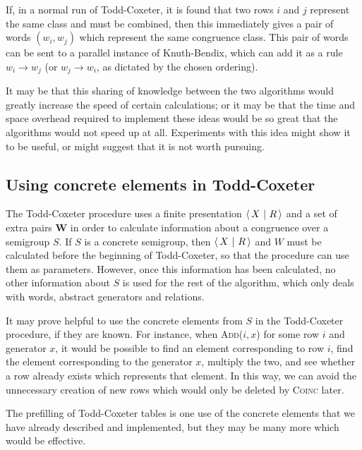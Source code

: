If, in a normal run of Todd-Coxeter, it is found that two rows $i$ and $j$
represent the same class and must be combined, then this immediately gives a
pair of words $(w_i,w_j)$ which represent the same congruence class.  This pair
of words can be sent to a parallel instance of Knuth-Bendix, which can add it as
a rule $w_i \to w_j$ (or $w_j \to w_i$, as dictated by the chosen ordering).

It may be that this sharing of knowledge between the two algorithms would
greatly increase the speed of certain calculations; or it may be that the time
and space overhead required to implement these ideas would be so great that the
algorithms would not speed up at all.  Experiments with this idea might show it
to be useful, or might suggest that it is not worth pursuing.

\subsection{Using concrete elements in Todd-Coxeter}
\label{sec:tc-concrete-elms}
The Todd-Coxeter procedure uses a finite presentation $\left\langle\,X ~\middle|~ R\,\right\rangle$ and a set of
extra pairs $\mathbf{W}$ in order to calculate information about a congruence
over a semigroup $S$.  If $S$ is a concrete semigroup, then $\left\langle\,X ~\middle|~ R\,\right\rangle$ and $W$
must be calculated before the beginning of Todd-Coxeter, so that the procedure
can use them as parameters.  However, once this information has been calculated,
no other information about $S$ is used for the rest of the algorithm, which only
deals with words, abstract generators and relations.

It may prove helpful to use the concrete elements from $S$ in the Todd-Coxeter
procedure, if they are known.  For instance, when \textsc{Add($i, x$)} for some
row $i$ and generator $x$, it would be possible to find an element corresponding
to row $i$, find the element corresponding to the generator $x$, multiply the
two, and see whether a row already exists which represents that element.  In
this way, we can avoid the unnecessary creation of new rows which would only be
deleted by \textsc{Coinc} later.

The prefilling of Todd-Coxeter tables is one use of the concrete elements that
we have already described and implemented, but they may be many more which would
be effective.

